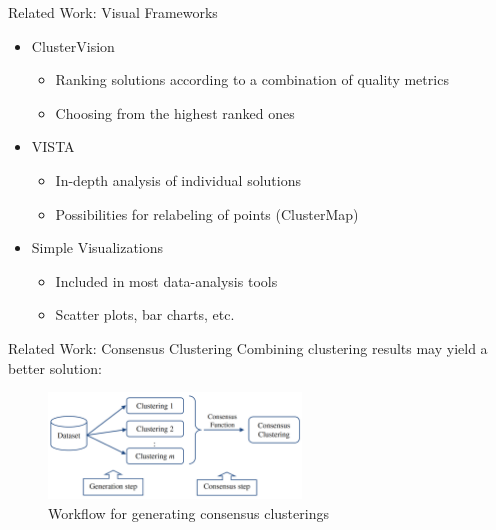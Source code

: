 \documentclass[aspectratio=169]{beamer}
\begin{document}
\begin{frame}{Related Work: Visual Frameworks}
	\begin{itemize}
		\item ClusterVision
		\begin{itemize}
			\item Ranking solutions according to a combination of quality metrics
			\item Choosing from the highest ranked ones
		\end{itemize}
		\item VISTA		
		\begin{itemize}
			\item In-depth analysis of individual solutions
			\item Possibilities for relabeling of points (ClusterMap)
		\end{itemize}
		\item Simple Visualizations
		\begin{itemize}
			\item Included in most data-analysis tools
			\item Scatter plots, bar charts, etc.
		\end{itemize}
	\end{itemize}
\end{frame}

\begin{frame}{Related Work: Consensus Clustering}
	Combining clustering results may yield a better solution:
	\begin{figure}
	  \centering
	    \includegraphics[width=0.6\textwidth]{flow}
	  \caption{Workflow for generating consensus clusterings \cite[p.~340]{survey1}}
	  \label{fig:flow}
	\end{figure}
\end{frame}
\end{document}
